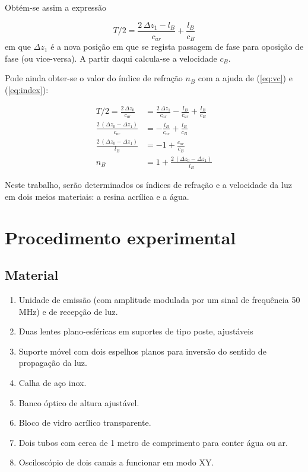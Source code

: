 \documentclass[a4paper,twoside,11pt]{report}      %
\begin{document}
Obtém-se assim a expressão

\begin{equation}
	\label{eq:vc_bloco}
	{T/2}  = \frac{2\,\Delta z_1 - l_B}{c_{ar}}  +  \frac{l_B}{c_{B}}
\end{equation}
em que $\Delta z_1$ é a nova posição em que se regista passagem de fase para oposição de fase (ou vice-versa). A partir daqui calcula-se a velocidade $c_{B}$.  

Pode ainda obter-se o valor do índice de refração $n_{B}$ com a ajuda de (\ref{eq:vc}) e (\ref{eq:index}):

\begin{align}
	\label{eq:n_bloco}
	{T/2}  = \frac{2\,\Delta z_0}{c_{ar}}  &=  \frac{2\,\Delta z_1 }{c_{ar}} -   \frac{l_B}{c_{ar}}  +  \frac{l_B}{c_{B}} \nonumber \\ 
	\frac{2\,(\Delta z_0- \Delta z_1 )}{c_{ar}}  &= -   \frac{l_B}{c_{ar}}  +  \frac{l_B}{c_{B}} \nonumber \\
	\frac{2\,(\Delta z_0- \Delta z_1 )}{l_B} &= -1 +  \frac{c_{ar}}{c_{B}} \nonumber \\
	n_{B} &= 1 +  \frac{2\,(\Delta z_0- \Delta z_1 )}{l_B} 
\end{align}

Neste trabalho, serão  determinados os índices de refração e a velocidade da luz em  dois meios materiais: a resina acrílica e a água. 
 


\newpage
\section{\sf Procedimento experimental}
\subsection{\sf Material}

\begin{enumerate}
\setlength{\itemsep}{0mm}
\item Unidade de emissão (com amplitude modulada por um sinal de frequência 50 MHz) e de recepção de luz.
\item Duas lentes plano-esféricas em suportes de tipo poste, ajustáveis
\item Suporte móvel com dois espelhos planos para inversão do sentido de propagação da luz.
\item Calha de aço inox.
\item Banco óptico de altura ajustável.  
\item Bloco de vidro acrílico transparente.
\item Dois tubos com cerca de 1 metro de comprimento para conter água ou ar. 
\item Osciloscópio de dois canais a funcionar em modo XY.
\end{enumerate}
\end{document}
